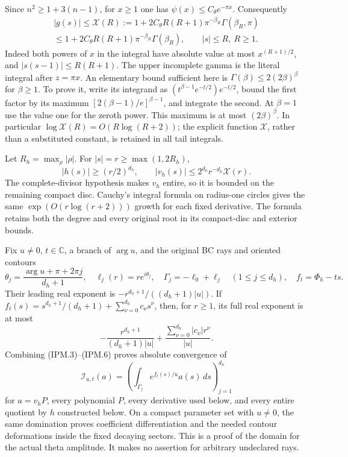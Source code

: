 Since \(n^2\ge1+3(n-1)\), for \(x\ge1\)
one has \(\psi(x)\le C_\theta e^{-\pi x}\). Consequently
\[
 \begin{gathered}
 |g(s)|\le\mathcal X(R):=
  1+2C_\theta R(R+1)\pi^{-\beta_R}\Gamma(\beta_R,\pi)\\
 \le 1+2C_\theta R(R+1)\pi^{-\beta_R}\Gamma(\beta_R),
 \qquad |s|\le R,\ R\ge1.
 \end{gathered}
 \tag{IPM.3}
\]
Indeed both powers of \(x\) in the integral have absolute value at most
\(x^{(R+1)/2}\), and \(|s(s-1)|\le R(R+1)\).
The upper incomplete gamma is the literal integral after \(z=\pi x\).
An elementary bound sufficient here is
\(\Gamma(\beta)\le2(2\beta)^\beta\) for \(\beta\ge1\).
To prove it, write its integrand as
\((t^{\beta-1}e^{-t/2})e^{-t/2}\), bound the first factor by
its maximum \([2(\beta-1)/e]^{\beta-1}\), and integrate the second.
At \(\beta=1\) use the value one for the zeroth power. This maximum
is at most \((2\beta)^\beta\). In particular
\(\log\mathcal X(R)=O(R\log(R+2))\); the explicit function
\(\mathcal X\), rather than a substituted constant, is retained in
all tail integrals.

Let \(R_h=\max_\rho|\rho|\). For \(|s|=r\ge\max(1,2R_h)\),
\[
 |h(s)|\ge(r/2)^{d_h},\qquad
 |v_h(s)|\le 2^{d_h}r^{-d_h}\mathcal X(r).
 \tag{IPM.4}
\]
The complete-divisor hypothesis makes \(v_h\) entire, so it is bounded
on the remaining compact disc. Cauchy's integral formula on radius-one
circles gives the same \(\exp(O(r\log(r+2)))\) growth for each fixed
derivative. The formula retains both the degree and every original root
in its compact-disc and exterior bounds.

Fix \(u\ne0\), \(t\in\mathbb C\), a branch of \(\arg u\), and
the original BC rays and oriented contours
\[
 \theta_j=\frac{\arg u+\pi+2\pi j}{d_h+1},\quad
 \ell_j(r)=re^{i\theta_j},\quad
 \Gamma_j=-\ell_0+\ell_j\quad(1\le j\le d_h),\quad
 f_t=\Phi_h-ts.
 \tag{IPM.5}
\]
Their leading real exponent is
\(-r^{d_h+1}/((d_h+1)|u|)\). If
\(f_t(s)=s^{d_h+1}/(d_h+1)+\sum_{\nu=0}^{d_h}c_\nu s^\nu\),
then, for \(r\ge1\), its full real exponent is at most
\[
 -\frac{r^{d_h+1}}{(d_h+1)|u|}
       +\frac{\sum_{\nu=0}^{d_h}|c_\nu|r^\nu}{|u|}.
 \tag{IPM.6}
\]
Combining (IPM.3)--(IPM.6) proves absolute convergence of
\[
 \mathcal I_{u,t}(a)=
  \left(\int_{\Gamma_j}e^{f_t(s)/u}a(s)\,ds\right)_{j=1}^{d_h}
 \tag{IPM.7}
\]
for \(a=v_hP\), every polynomial \(P\), every derivative used below,
and every entire quotient by \(h\) constructed below. On a compact
parameter set with \(u\ne0\), the same domination proves coefficient
differentiation and the needed contour deformations inside the fixed
decaying sectors. This is a proof of the domain for the actual theta
amplitude. It makes no assertion for arbitrary undeclared rays.

